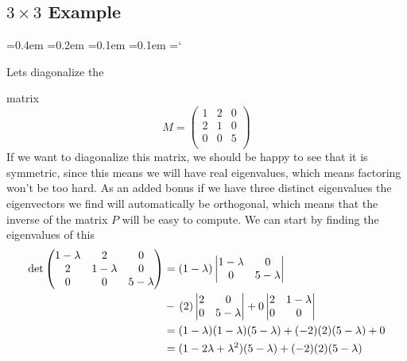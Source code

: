 
\subsection*{$3\times3$ Example}

{\ttfamily
{}\font=0.4em
\font=0.2em
\font=0.1em
\font=0.1em
\hyphenchar\font=`\-


\hypertarget{scripts_diagonalizing_symmetric_matrices_3by3_example}{Lets diagonalize the} matrix
\[
M = 
\begin{pmatrix}
1 &2 & 0 \\
2 & 1 & 0 \\
0& 0 & 5  \\
\end{pmatrix}
\] 
If we want to diagonalize this matrix, we should be happy to see that it is symmetric, since this means we will have real eigenvalues, which means factoring won't be too hard.  As an added bonus if we have three distinct eigenvalues the eigenvectors we find will automatically be orthogonal, which means that the inverse of the matrix $P$ will be easy to compute. We can start by finding the eigenvalues of this 
\begin{align*}
\det \begin{pmatrix}
1-\lambda &\mc2 & \mc0 \\
\mc2 & 1 -\lambda& \mc0 \\
\mc0& \mc0 & 5-\lambda  \\
\end{pmatrix}
 &= (1-\lambda) 
\begin{vmatrix}
1 -\lambda&\mc 0 \\
\mc0 & 5-\lambda  \\
\end{vmatrix}
\\
 & - \, (2) 
 \begin{vmatrix}
2 & \mc0 \\
0& 5-\lambda  \\
\end{vmatrix}
 + 0 \begin{vmatrix}
2 & 1 -\lambda \\
0& \mc0   \\
\end{vmatrix}\\
&=(1-\lambda)(1-\lambda)(5-\lambda)+ (-2)(2)(5-\lambda) +0\\
&=(1-2\lambda +\lambda^2)(5-\lambda) + (-2)(2)(5-\lambda)\\

\end{align*}}
